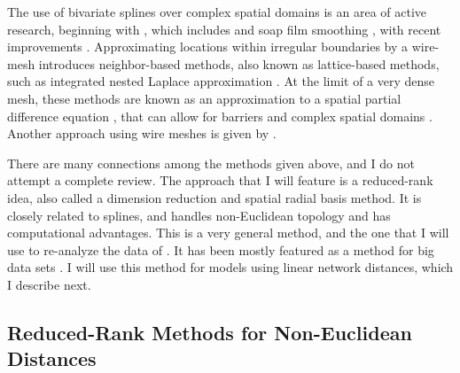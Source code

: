 The use of bivariate splines over complex spatial domains is an area of active research, beginning with \citet{Rams:spli:2002}, which includes \citet{Wang:Rana:low:2007} and soap film smoothing \citep{Wood:Brav:Hedl:soap:2008}, with recent improvements \citep{Sang:Rams:Rams:spat:2013, Mill:Wood:fini:2014}. Approximating locations within irregular boundaries by a wire-mesh introduces neighbor-based methods, also known as lattice-based methods, such as integrated nested Laplace approximation \citep[INLA,][]{Rue:Mart:Chop:appr:2009}.  At the limit of a very dense mesh, these methods are known as an approximation to a spatial partial difference equation \citep[SPDE,][]{Lind:Rue:Lind:expl:2011}, that can allow for barriers and complex spatial domains \citep{Bakk:Vanh:Illi:Simp:acco:2016}.  Another approach using wire meshes is given by \citet{McIn:Barr:latt:2017}. 

There are many connections among the methods given above, and I do not attempt a complete review. The approach that I will feature is a reduced-rank idea, also called a dimension reduction \citep{Wikl:Cres:dime:1999} and spatial radial basis \citep{Lin:Chen:spat:2004, Hefl:Brom:Bros:Bude:basi:2016} method. It is closely related to splines, and handles non-Euclidean topology and has computational advantages.  This is a very general method, and the one that I will use to re-analyze the data of \citet{Ladl:Avga:Whea:Boyc:pred:2016}.  It has been mostly featured as a method for big data sets \citep[e.g.][]{Wikl:Cres:dime:1999, Rupp:Wand:Carr:semi:2003, Cres:Gard:fixe:2008,Bane:Gelf:Finl:Sang:gaus:2008}.  I will use this method for models using linear network distances, which I describe next.


\subsection*{Reduced-Rank Methods for Non-Euclidean Distances}

